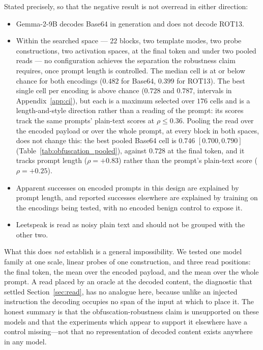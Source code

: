 Stated precisely, so that the negative result is not overread in either direction:

\begin{itemize}
\item Gemma-2-9B decodes Base64 in generation and does not decode ROT13.
\item Within the searched space --- $22$ blocks, two template modes, two probe constructions, two activation spaces,
      at the final token and under two pooled reads --- no configuration achieves the separation the robustness claim requires, once prompt
      length is controlled. The median cell is at or below chance for both encodings ($0.482$ for Base64, $0.399$ for
      ROT13). The best single cell per encoding is above chance ($0.728$ and $0.787$, intervals in
      Appendix~\ref{app:ci}), but each is a maximum selected over $176$ cells and is a length-and-style direction
      rather than a reading of the prompt: its scores track the same prompts' plain-text scores at $\rho \le 0.36$.
      Pooling the read over the encoded payload or over the whole prompt, at every block in both spaces, does not
      change this: the best pooled Base64 cell is $0.746$ $[0.700, 0.790]$ (Table~\ref{tab:obfuscation_pooled}),
      against $0.728$ at the final token, and it tracks prompt length ($\rho = +0.83$) rather than the prompt's
      plain-text score ($\rho = +0.25$).
\item Apparent successes on encoded prompts in this design are explained by prompt length, and reported successes
      elsewhere are explained by training on the encodings being tested, with no encoded benign control to expose it.
\item Leetspeak is read as noisy plain text and should not be grouped with the other two.
\end{itemize}

What this does \emph{not} establish is a general impossibility. We tested one model family at one scale, linear probes
of one construction, and three read positions: the final token, the mean over the encoded payload, and the mean over
the whole prompt. A read placed by an oracle at the decoded content, the diagnostic that settled
Section~\ref{sec:read}, has no analogue here, because unlike an injected instruction the decoding occupies no span of
the input at which to place it. The honest summary is that the obfuscation-robustness
claim is unsupported on these models and that the experiments which appear to support it elsewhere have a control
missing---not that no representation of decoded content exists anywhere in any model.
